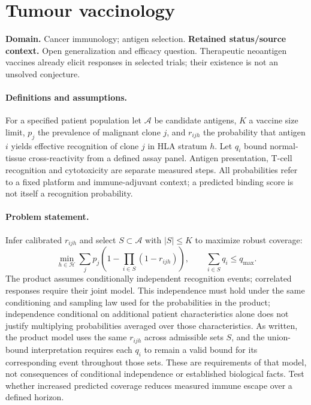 \documentclass[11pt]{article}
\begin{document}
\section*{Tumour vaccinology}
\label{prob:258}
\label{rank:42}
\par\smallskip

\noindent\textbf{Domain.} Cancer immunology; antigen selection. \quad \textbf{Retained status/source context.} Open generalization and efficacy question. Therapeutic neoantigen vaccines already elicit responses in selected trials; their existence is not an unsolved conjecture.

\paragraph{Definitions and assumptions.} For a specified patient population let $\mathcal A$ be candidate antigens, $K$ a vaccine size limit, $p_j$ the prevalence of malignant clone $j$, and $r_{ijh}$ the probability that antigen $i$ yields effective recognition of clone $j$ in HLA stratum $h$. Let $q_i$ bound normal-tissue cross-reactivity from a defined assay panel. Antigen presentation, T-cell recognition and cytotoxicity are separate measured steps. All probabilities refer to a fixed platform and immune-adjuvant context; a predicted binding score is not itself a recognition probability.

\paragraph{Problem statement.} Infer calibrated $r_{ijh}$ and select $S\subset\mathcal A$ with $|S|\leq K$ to maximize robust coverage:
\[
\min_{h\in\mathcal H}\sum_jp_j\left(1-\prod_{i\in S}(1-r_{ijh})\right),
\qquad \sum_{i\in S}q_i\leq q_{\max}.
\]
The product assumes conditionally independent recognition events; correlated responses require their joint model. This independence must hold under the same conditioning and sampling law used for the probabilities in the product; independence conditional on additional patient characteristics alone does not justify multiplying probabilities averaged over those characteristics. As written, the product model uses the same $r_{ijh}$ across admissible sets $S$, and the union-bound interpretation requires each $q_i$ to remain a valid bound for its corresponding event throughout those sets. These are requirements of that model, not consequences of conditional independence or established biological facts. Test whether increased predicted coverage reduces measured immune escape over a defined horizon.
\end{document}
